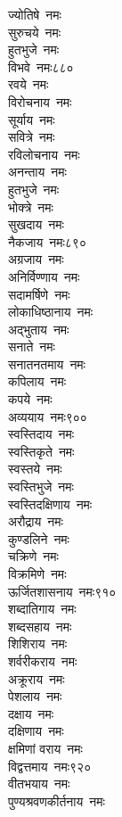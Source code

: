 \begin{multicols}{\maxColumns}
\begin{flushleft}
ज्योतिषे~नमः\\
सुरुचये~नमः\\
हुतभुजे~नमः\\
विभवे~नमः\hfill ८८०\\
रवये~नमः\\
विरोचनाय~नमः\\
सूर्याय~नमः\\
सवित्रे~नमः\\
रविलोचनाय~नमः\\
अनन्ताय~नमः\\
हुतभुजे~नमः\\
भोक्त्रे~नमः\\
सुखदाय~नमः\\
नैकजाय~नमः\hfill ८९०\\
अग्रजाय~नमः\\
अनिर्विण्णाय~नमः\\
सदामर्षिणे~नमः\\
लोकाधिष्ठानाय~नमः\\
अद्भुताय~नमः\\
सनाते~नमः\\
सनातनतमाय~नमः\\
कपिलाय~नमः\\
कपये~नमः\\
अव्ययाय~नमः\hfill ९००\\
स्वस्तिदाय~नमः\\
स्वस्तिकृते~नमः\\
स्वस्तये~नमः\\
स्वस्तिभुजे~नमः\\
स्वस्तिदक्षिणाय~नमः\\
अरौद्राय~नमः\\
कुण्डलिने~नमः\\
चक्रिणे~नमः\\
विक्रमिणे~नमः\\
ऊर्जितशासनाय~नमः\hfill ९१०\\
शब्दातिगाय~नमः\\
शब्दसहाय~नमः\\
शिशिराय~नमः\\
शर्वरीकराय~नमः\\
अक्रूराय~नमः\\
पेशलाय~नमः\\
दक्षाय~नमः\\
दक्षिणाय~नमः\\
क्षमिणां वराय~नमः\\
विद्वत्तमाय~नमः\hfill ९२०\\
वीतभयाय~नमः\\
पुण्यश्रवणकीर्तनाय~नमः\\

\end{flushleft}
\end{multicols}
